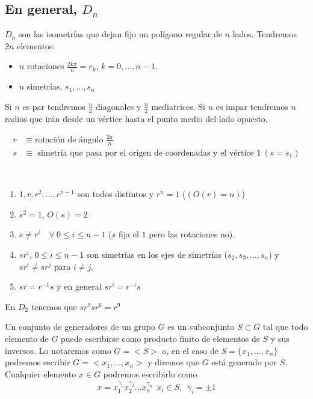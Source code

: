 \subsection{En general, $D_n$}

$D_n$ son las isometrías que dejan fijo un polígono regular de $n$ lados.
Tendremos $2n$ elementos:
\begin{itemize}
    \item $n$ rotaciones $\frac{2k\pi}{n} = r_k$, $k=0,\dots,n-1$.
    \item $n$ simetrías, $s_1,\dots,s_n$
\end{itemize}
Si $n$ es par tendremos $\frac{n}{2}$ diagonales y $\frac{n}{2}$ mediatrices. Si $n$ es impar tendremos $n$ radios que irán desde un vértice hasta el punto medio del lado opuesto.

\begin{notacion}
    \begin{align*}
        r &\equiv \text{rotación de ángulo }\frac{2\pi}{n}\\
        s & \equiv \text{ simetría que pasa por el origen de coordenadas y el vértice }1\ (s=s_1)
    \end{align*}
\end{notacion}

\begin{lema}\
    \begin{enumerate}
        \item $1,r,r^2,\dots,r^{n-1}$ son todos distintos y $r^n=1$ ($(O(r)=n)$)
        \item $s^2=1$, $O(s)=2$
        \item $s\neq r^i$\ \  $\forall\ 0 \leq i \leq n-1$ ($s$ fija el $1$ pero las rotaciones no).
        \item $sr^i$, $0\leq i \leq n-1$ son simetrías en los ejes de simetrías ($s_2, s_3,\dots,s_n$) y $sr^i\neq sr^j$ para $i\neq j$.
        \item $sr=r^{-1}s$ y en general $sr^i = r^{-i}s$
    \end{enumerate}
\end{lema}

\begin{ejemplo}
    En $D_2$ tenemos que $sr^9sr^6 = r^9$
\end{ejemplo}

\begin{definicion}
    Un conjunto de generadores de un grupo $G$ es un subconjunto $S\subset G$ tal que todo elemento de $G$ puede escribirse como producto finito de elementos de $S$ y sus inversos. Lo notaremos como $G=<S>$ o, en el caso de $S=\{x_1,\dots,x_n\}$ podremos escribir $G=<x_1,\dots,x_n>$ y diremos que $G$ está generado por $S$.\\

    Cualquier elemento $x\in G$ podremos escribirlo como
    \begin{align*}
        x=x_1^{\gamma_1}x_2^{\gamma_2}\dots x_n^{\gamma_n}\ \ x_i\in S,\ \ \gamma_i=\pm1
    \end{align*}
\end{definicion}

